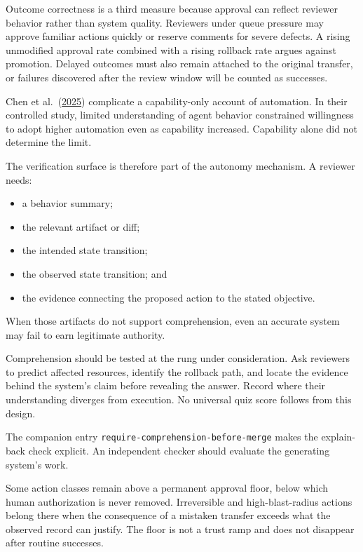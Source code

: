 Outcome correctness is a third measure because approval can reflect reviewer behavior rather than system quality. Reviewers under queue pressure may approve familiar actions quickly or reserve comments for severe defects. A rising unmodified approval rate combined with a rising rollback rate argues against promotion. Delayed outcomes must also remain attached to the original transfer, or failures discovered after the review window will be counted as successes.

Chen et al.~(\href{https://arxiv.org/abs/2507.08149}{2025}) complicate a capability-only account of automation. In their controlled study, limited understanding of agent behavior constrained willingness to adopt higher automation even as capability increased. Capability alone did not determine the limit.


The verification surface is therefore part of the autonomy mechanism. A reviewer needs:

\begin{itemize}
\tightlist
\item
  a behavior summary;
\item
  the relevant artifact or diff;
\item
  the intended state transition;
\item
  the observed state transition; and
\item
  the evidence connecting the proposed action to the stated objective.
\end{itemize}

When those artifacts do not support comprehension, even an accurate system may fail to earn legitimate authority.

Comprehension should be tested at the rung under consideration. Ask reviewers to predict affected resources, identify the rollback path, and locate the evidence behind the system's claim before revealing the answer. Record where their understanding diverges from execution. No universal quiz score follows from this design.

The companion entry \texttt{require-comprehension-before-merge} makes the explain-back check explicit. An independent checker should evaluate the generating system's work.

Some action classes remain above a permanent approval floor, below which human authorization is never removed. Irreversible and high-blast-radius actions belong there when the consequence of a mistaken transfer exceeds what the observed record can justify. The floor is not a trust ramp and does not disappear after routine successes.

